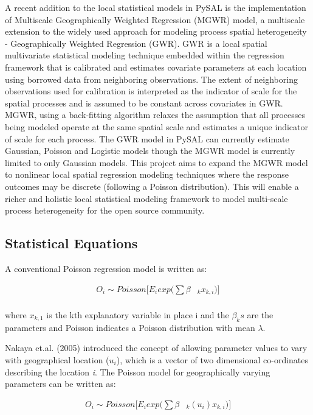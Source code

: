 \documentclass[11pt]{article}
\begin{document}
A recent addition to the local statistical models in PySAL is the
implementation of Multiscale Geographically Weighted Regression (MGWR)
model, a multiscale extension to the widely used approach for modeling
process spatial heterogeneity - Geographically Weighted Regression
(GWR). GWR is a local spatial multivariate statistical modeling
technique embedded within the regression framework that is calibrated
and estimates covariate parameters at each location using borrowed data
from neighboring observations. The extent of neighboring observations
used for calibration is interpreted as the indicator of scale for the
spatial processes and is assumed to be constant across covariates in
GWR. MGWR, using a back-fitting algorithm relaxes the assumption that
all processes being modeled operate at the same spatial scale and
estimates a unique indicator of scale for each process. The GWR model in
PySAL can currently estimate Gaussian, Poisson and Logistic models
though the MGWR model is currently limited to only Gaussian models. This
project aims to expand the MGWR model to nonlinear local spatial
regression modeling techniques where the response outcomes may be
discrete (following a Poisson distribution). This will enable a richer
and holistic local statistical modeling framework to model multi-scale
process heterogeneity for the open source community.

\subsection{Statistical Equations}\label{statistical-equations}

A conventional Poisson regression model is written as:

\begin{align}
O_i {\sim} Poisson[E_i exp ({\sum} {\beta} & _k x _{k,i})] \\
\end{align}

where \(x_{k,1}\) is the kth explanatory variable in place i and the
\({\beta}_ks\) are the parameters and Poisson indicates a Poisson
distribution with mean \(\lambda\).

Nakaya et.al. (2005) introduced the concept of allowing parameter values
to vary with geographical location (\(u_i\)), which is a vector of two
dimensional co-ordinates describing the location \emph{i}. The Poisson
model for geographically varying parameters can be written as:

\begin{align}
O_i {\sim} Poisson[E_i exp ({\sum} {\beta} & _k (u_i) x _{k,i})] \\
\end{align}
\end{document}
